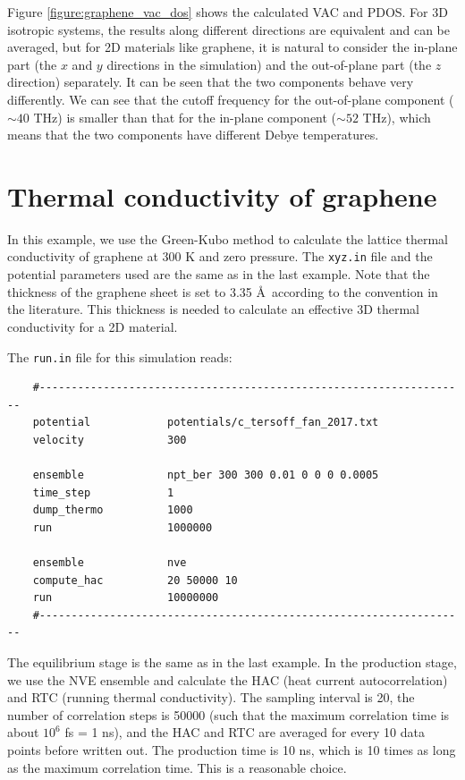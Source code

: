 \documentclass[12pt,a4paper]{report}
\begin{document}
Figure \ref{figure:graphene_vac_dos} shows the calculated VAC and PDOS.
For 3D isotropic systems, the results along different directions are equivalent and can be averaged, but for 2D materials like graphene, it is natural to consider the in-plane part (the $x$ and $y$ directions in the simulation) and the out-of-plane part (the $z$ direction) separately. It can be seen that the two components behave very differently. We can see that the cutoff frequency for the out-of-plane component ($\sim4 0$ THz) is smaller than that for the in-plane component ($\sim 52$ THz), which means that the two components have different Debye temperatures.


\section{Thermal conductivity of graphene}


In this example, we use the Green-Kubo method to calculate the lattice thermal conductivity of graphene at 300 K and zero pressure. The \verb"xyz.in" file and the potential parameters used are the same as in the last example. Note that the thickness of the graphene sheet is set to 3.35 \AA ~according to the convention in the literature. This thickness is needed to calculate an effective 3D thermal conductivity for a 2D material.


The \verb"run.in" file for this simulation reads:
\begin{verbatim}
    #-------------------------------------------------------------------
    potential            potentials/c_tersoff_fan_2017.txt
    velocity             300

    ensemble             npt_ber 300 300 0.01 0 0 0 0.0005
    time_step            1
    dump_thermo          1000
    run                  1000000

    ensemble             nve
    compute_hac          20 50000 10
    run                  10000000
    #-------------------------------------------------------------------
\end{verbatim}

The equilibrium stage is the same as in the last example. In the production stage, we use the NVE ensemble and calculate the HAC (heat current autocorrelation) and RTC (running thermal conductivity). The sampling interval is 20, the number of correlation steps is 50000 (such that the maximum correlation time is about $10^6$ fs = 1 ns), and the HAC and RTC are averaged for every 10 data points before written out. The production time is 10 ns, which is 10 times as long as the maximum correlation time. This is a reasonable choice.
\end{document}
